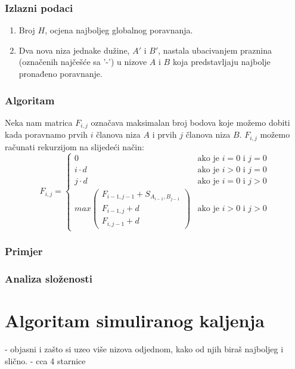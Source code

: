 \documentclass[times, utf8, zavrsni]{fer}
\begin{document}
\subsection{Izlazni podaci}
\begin{enumerate}
	\item Broj $H$, ocjena najboljeg globalnog poravnanja.
	\item Dva nova niza jednake dužine, $A'$ i $B'$, nastala ubacivanjem praznina
		(označenih najčešće sa '-') u nizove $A$ i $B$ koja predstavljaju najbolje pronađeno
		poravnanje.
\end{enumerate}

\subsection{Algoritam}
Neka nam matrica $F_{i,j}$ označava maksimalan broj bodova koje možemo dobiti kada
poravnamo prvih $i$ članova niza $A$ i prvih $j$ članova niza $B$. $F_{i,j}$ možemo
računati rekurzijom na slijedeći način:
$$
F_{i,j} = \left\{
	\begin{array}{lr}
		0 & \mbox{ako je } i=0 \mbox{ i } j=0 \\
		i \cdot d & \mbox{ako je } i>0 \mbox{ i } j=0 \\
		j \cdot d & \mbox{ako je } i=0 \mbox{ i } j>0 \\
		max \left(
			\begin{array}{l}
				F_{i-1,j-1} + S_{A_{i-1}, B_{j-1}} \\
				F_{i-1, j} + d \\
				F_{i, j-1} + d
			\end{array}
		\right) & \mbox{ako je } i>0 \mbox{ i } j>0
	\end{array}
\right.
$$

\subsection{Primjer}

\subsection{Analiza složenosti}


\chapter{Algoritam simuliranog kaljenja}
- objasni i zašto si uzeo više nizova odjednom, kako od njih biraš najboljeg i slično.
- cca 4 starnice
\end{document}
